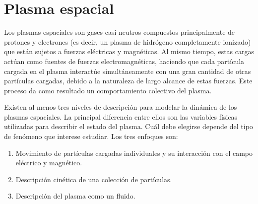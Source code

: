 \section{Plasma espacial}

Los plasmas espaciales son gases casi neutros compuestos
principalmente de protones y electrones (es decir, un plasma de
hidrógeno completamente ionizado) que están sujetos a fuerzas
eléctricas y magnéticas. Al mismo tiempo, estas cargas actúan como
fuentes de fuerzas electromagnéticas, haciendo que cada partícula
cargada en el plasma interactúe simultáneamente con una gran cantidad
de otras partículas cargadas, debido a la naturaleza de largo alcance
de estas fuerzas. Este proceso da como resultado un comportamiento
colectivo del plasma.

Existen al menos tres niveles de descripción para modelar la dinámica de
los plasmas espaciales. La principal diferencia entre ellos son las
variables físicas utilizadas para describir el estado del plasma. Cuál
debe elegirse depende del tipo de fenómeno que interese
estudiar. Los tres enfoques son:
\begin{enumerate}
\item Movimiento de partículas cargadas individuales y su interacción
con el campo eléctrico y magnético.
\item Descripción cinética de una colección de partículas.
\item Descripción del plasma como un fluido.
\end{enumerate}

